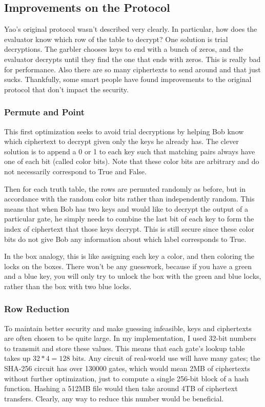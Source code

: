 \subsection{Improvements on the Protocol}
Yao's original protocol wasn't described very clearly. In particular, how does the evaluator know which row of the table to decrypt? One solution is trial decryptions. The garbler chooses keys to end with a bunch of zeros, and the evaluator decrypts until they find the one that ends with zeros. This is really bad for performance. Also there are so many ciphertexts to send around and that just sucks. Thankfully, some smart people have found improvements to the original protocol that don't impact the security. 

\subsubsection{Permute and Point}
This first optimization seeks to avoid trial decryptions by helping Bob know which ciphertext to decrypt given only the keys he already has. The clever solution is to append a 0 or 1 to each key such that matching pairs always have one of each bit (called color bits)\cite{gentle}. Note that these color bits are arbitrary and do not necessarily correspond to True and False.

Then for each truth table, the rows are permuted randomly as before, but in accordance with the random color bits rather than independently random\cite{gentle}. This means that when Bob has two keys and would like to decrypt the output of a particular gate, he simply needs to combine the last bit of each key to form the index of ciphertext that those keys decrypt. This is still secure since these color bits do not give Bob any information about which label corresponds to True\cite{Fairplay}.

In the box analogy, this is like assigning each key a color, and then coloring the locks on the boxes. There won't be any guesswork, because if you have a green and a blue key, you will only try to unlock the box with the green and blue locks, rather than the box with two blue locks.

\subsubsection{Row Reduction}
To maintain better security and make guessing infeasible, keys and ciphertexts are often chosen to be quite large. In my implementation, I used 32-bit numbers to transmit and store these values. This means that each gate's lookup table takes up $32*4=128$ bits. Any circuit of real-world use will have many gates; the SHA-256 circuit has over 130000 gates\cite{bristol}, which would mean 2MB of ciphertexts without further optimization, just to compute a single 256-bit block of a hash function. Hashing a 512MB file would then take around 4TB of ciphertext transfers. Clearly, any way to reduce this number would be beneficial.

